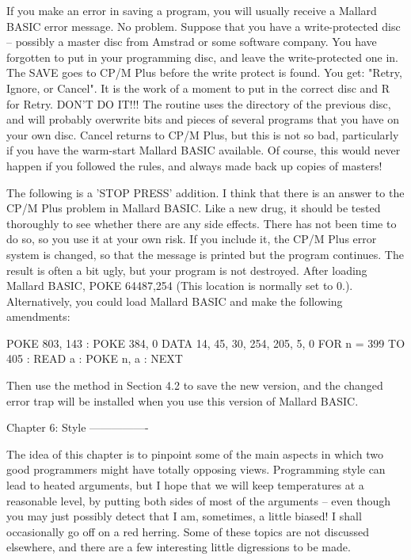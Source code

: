 If  you make an error in saving a program, you will usually receive a  Mallard 
BASIC error message. No problem. Suppose that you have a write-protected  disc 
--  possibly  a master disc from Amstrad or some software  company.  You  have 
forgotten  to put in your programming disc, and leave the write-protected  one 
in.  The  SAVE goes to CP/M Plus before the write protect is found.  You  get: 
"Retry,  Ignore, or Cancel". It is the work of a moment to put in the  correct 
disc  and  R for Retry. DON'T DO IT!!! The routine uses the directory  of  the 
previous disc, and will probably overwrite bits and pieces of several programs 
that  you have on your own disc. Cancel returns to CP/M Plus, but this is  not 
so  bad, particularly if you have the warm-start Mallard BASIC  available.  Of 
course,  this  would never happen if you followed the rules, and  always  made 
back up copies of masters!

The  following is a 'STOP PRESS' addition. I think that there is an answer  to 
the  CP/M Plus problem in Mallard BASIC. Like a new drug, it should be  tested 
thoroughly to see whether there are any side effects. There has not been  time 
to  do  so, so you use it at your own risk. If you include it, the  CP/M  Plus 
error  system  is  changed, so that the message is  printed  but  the  program 
continues. The result is often a bit ugly, but your program is not  destroyed. 
After loading Mallard BASIC, POKE 64487,254 (This location is normally set  to 
0.).  Alternatively,  you  could load Mallard BASIC  and  make  the  following 
amendments:

        POKE 803, 143 : POKE 384, 0
        DATA 14, 45, 30, 254, 205, 5, 0
        FOR n = 399 TO 405 : READ a : POKE n, a : NEXT

Then  use the method in Section 4.2 to save the new version, and  the  changed 
error trap will be installed when you use this version of Mallard BASIC.


Chapter 6: Style
----------------

The idea of this chapter is to pinpoint some of the main aspects in which  two 
good programmers might have totally opposing views. Programming style can lead 
to heated arguments, but I hope that we will keep temperatures at a reasonable 
level,  by putting both sides of most of the arguments -- even though you  may 
just  possibly  detect  that  I  am,  sometimes,  a  little  biased!  I  shall 
occasionally  go off on a red herring. Some of these topics are not  discussed 
elsewhere, and there are a few interesting little digressions to be made.



